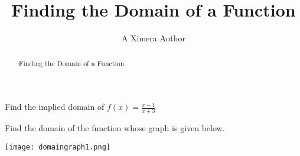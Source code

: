 \documentclass{ximera}
\title{Finding the Domain of a Function}
\author{A Ximera Author}
\begin{document}
\begin{abstract}
Finding the Domain of a Function
\end{abstract}

\maketitle

\begin{problem}
Find the implied domain of $f(x) = \frac{x - 1}{x + 3}$
\begin{multipleChoice}
\end{multipleChoice}
\end{problem}

\begin{problem}
Find the domain of the function whose graph is given below.

\begin{image}
\texttt{[image: domaingraph1.png]}
\end{image}

\begin{multipleChoice}
\choice[correct]{$[-5, -3) \cup (-3, 3)$}
\choice{$[-5, 3]$}
\choice{$[-5, -3) \cup (-3, -1) \cup (-1, 3)$}
\choice{$(-2, -1) \cup [0, 4)$}
\end{multipleChoice}
\end{problem}
\end{document}
